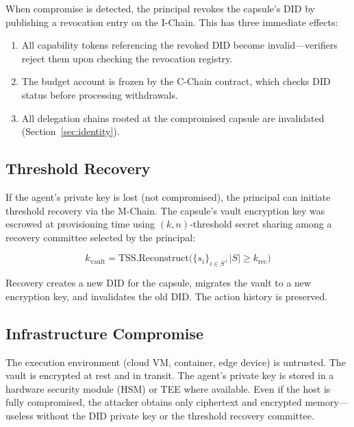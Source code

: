 When compromise is detected, the principal revokes the capsule's DID by publishing a revocation entry on the I-Chain. This has three immediate effects:

\begin{enumerate}
    \item All capability tokens referencing the revoked DID become invalid---verifiers reject them upon checking the revocation registry.
    \item The budget account is frozen by the C-Chain contract, which checks DID status before processing withdrawals.
    \item All delegation chains rooted at the compromised capsule are invalidated (Section~\ref{sec:identity}).
\end{enumerate}

\subsection{Threshold Recovery}

If the agent's private key is lost (not compromised), the principal can initiate threshold recovery via the M-Chain. The capsule's vault encryption key was escrowed at provisioning time using $(k, n)$-threshold secret sharing among a recovery committee selected by the principal:

\begin{equation}\label{eq:recovery}
    k_{\text{vault}} = \text{TSS.Reconstruct}\big(\{s_i\}_{i \in S}, |S| \geq k_{\text{rec}}\big)
\end{equation}

Recovery creates a new DID for the capsule, migrates the vault to a new encryption key, and invalidates the old DID. The action history is preserved.

\subsection{Infrastructure Compromise}

The execution environment (cloud VM, container, edge device) is untrusted. The vault is encrypted at rest and in transit. The agent's private key is stored in a hardware security module (HSM) or TEE where available. Even if the host is fully compromised, the attacker obtains only ciphertext and encrypted memory---useless without the DID private key or the threshold recovery committee.

